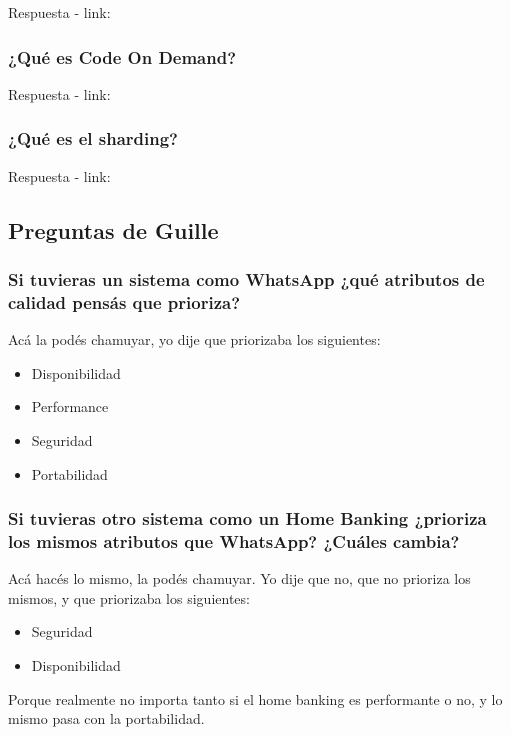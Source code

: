 \documentclass{article}
\begin{document}
    Respuesta - link: \textbf{~}

    \subsubsection{¿Qué es Code On Demand?}

    Respuesta - link: \textbf{~}


    \subsubsection{¿Qué es el sharding?}

    Respuesta - link: \textbf{~}
    
   \subsection{Preguntas de Guille}
   
   \subsubsection{Si tuvieras un sistema como WhatsApp ¿qué atributos de calidad pensás que prioriza?}
    Acá la podés chamuyar, yo dije que priorizaba los siguientes:
    \begin{itemize}
        \item Disponibilidad
        \item Performance
        \item Seguridad
        \item Portabilidad
    \end{itemize}

  \subsubsection{Si tuvieras otro sistema como un Home Banking ¿prioriza los mismos atributos que WhatsApp? ¿Cuáles cambia?}
    Acá hacés lo mismo, la podés chamuyar. Yo dije que no, que no prioriza los mismos, y que priorizaba los siguientes:
    \begin{itemize}
        \item Seguridad
        \item Disponibilidad
    \end{itemize}

    Porque realmente no importa tanto si el home banking es performante o no, y lo mismo pasa con la portabilidad.
\end{document}
